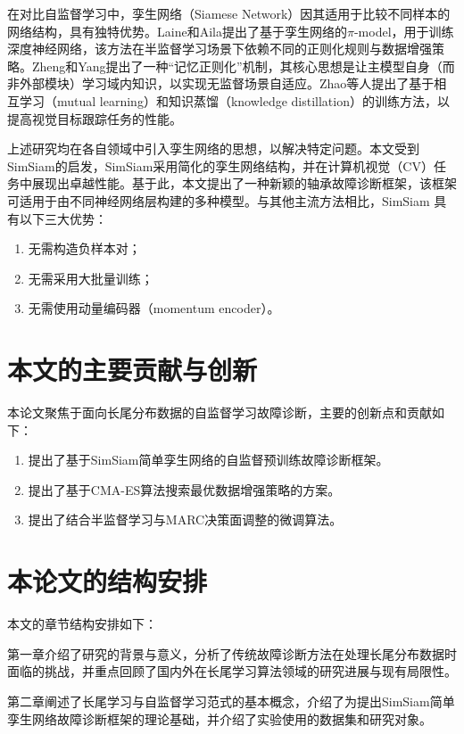 \documentclass[master]{thesis-uestc}
\begin{document}
在对比自监督学习中，孪生网络（Siamese Network）因其适用于比较不同样本的网络结构，具有独特优势。Laine和Aila提出了基于孪生网络的$\pi$-model，用于训练深度神经网络，该方法在半监督学习场景下依赖不同的正则化规则与数据增强策略。Zheng和Yang提出了一种“记忆正则化”机制，其核心思想是让主模型自身（而非外部模块）学习域内知识，以实现无监督场景自适应。Zhao等人提出了基于相互学习（mutual learning）和知识蒸馏（knowledge distillation）的训练方法，以提高视觉目标跟踪任务的性能。

上述研究均在各自领域中引入孪生网络的思想，以解决特定问题。本文受到SimSiam的启发，SimSiam采用简化的孪生网络结构，并在计算机视觉（CV）任务中展现出卓越性能。基于此，本文提出了一种新颖的轴承故障诊断框架，该框架可适用于由不同神经网络层构建的多种模型。与其他主流方法相比，SimSiam 具有以下三大优势：
\begin{enumerate}
    \item 无需构造负样本对；
    \item 无需采用大批量训练；
    \item 无需使用动量编码器（momentum encoder）。
\end{enumerate}


\section{本文的主要贡献与创新}

本论文聚焦于面向长尾分布数据的自监督学习故障诊断，主要的创新点和贡献如下：

\begin{enumerate}
    \item 提出了基于SimSiam简单孪生网络的自监督预训练故障诊断框架。
    \item 提出了基于CMA-ES算法搜索最优数据增强策略的方案。
    \item 提出了结合半监督学习与MARC决策面调整的微调算法。
\end{enumerate}

\section{本论文的结构安排}

本文的章节结构安排如下：

第一章介绍了研究的背景与意义，分析了传统故障诊断方法在处理长尾分布数据时面临的挑战，并重点回顾了国内外在长尾学习算法领域的研究进展与现有局限性。

第二章阐述了长尾学习与自监督学习范式的基本概念，介绍了为提出SimSiam简单孪生网络故障诊断框架的理论基础，并介绍了实验使用的数据集和研究对象。
\end{document}
